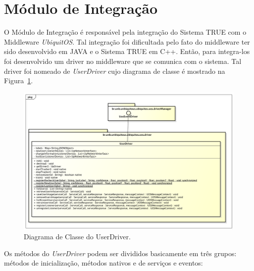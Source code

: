 \section{Módulo de Integração}

O Módulo de Integração é responsável pela integração do Sistema TRUE  com o Middleware \textit{UbiquitOS}. Tal integração foi dificultada pelo fato do middleware ter sido desenvolvido em JAVA e o Sistema TRUE em C++. Então, para integra-los foi desenvolvido um driver no middleware que se comunica com o sistema. Tal driver foi nomeado de \textit{UserDriver} cujo diagrama de classe é mostrado na Figura~\ref{fig:userdriver}.

	\begin{figure}[hbt]
		\begin{center}
			\includegraphics[scale=0.45]{figuras/4.ProblemaEProposta/diagrama-classe-userdriver.png}
		\end{center}
		\caption{Diagrama de Classe do UserDriver.}
		\label{fig:userdriver}
	\end{figure}

Os métodos do \textit{UserDriver} podem ser divididos basicamente em três grupos: métodos de inicialização, métodos nativos e de serviços e eventos:


